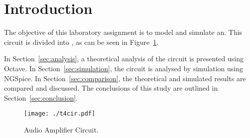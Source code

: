 \section{Introduction}
\label{sec:introduction}


The objective of this laboratory assignment is to model and simulate an. This circuit is divided into , as can be seen in Figure~\ref{fig:cir}.

In Section~\ref{sec:analysis}, a theoretical analysis of the circuit is presented using Octave. In Section~\ref{sec:simulation}, the circuit is analysed by simulation using NGSpice. In Section~\ref{sec:comparison}, the theoretical and simulated results are compared and discussed. The conclusions of this study are outlined in
Section~\ref{sec:conclusion}.

\begin{figure}[h] \centering
\texttt{[image: ./t4cir.pdf]}
\caption{Audio Amplifier Circuit.}
\label{fig:cir}
\end{figure}

